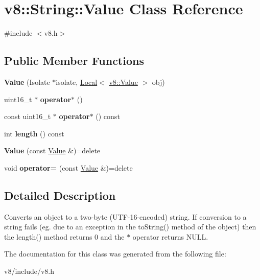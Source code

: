 \hypertarget{classv8_1_1String_1_1Value}{}\section{v8\+:\+:String\+:\+:Value Class Reference}
\label{classv8_1_1String_1_1Value}


{\ttfamily \#include $<$v8.\+h$>$}

\subsection*{Public Member Functions}
\begin{DoxyCompactItemize}
\item 
\mbox{\label{classv8_1_1String_1_1Value_a9254394df4e1c4a8d9749cc0a5b55601}} 
{\bfseries Value} (Isolate $\ast$isolate, \mbox{\hyperlink{classv8_1_1Local}{Local}}$<$ \mbox{\hyperlink{classv8_1_1Value}{v8\+::\+Value}} $>$ obj)
\item 
\mbox{\label{classv8_1_1String_1_1Value_ae4f44b1977968de2e9f2ff703437fde3}} 
uint16\+\_\+t $\ast$ {\bfseries operator$\ast$} ()
\item 
\mbox{\label{classv8_1_1String_1_1Value_a15e247c80ec874daee13e6fca1b24629}} 
const uint16\+\_\+t $\ast$ {\bfseries operator$\ast$} () const
\item 
\mbox{\label{classv8_1_1String_1_1Value_aeb5be29097c4c23c2c63fe833145dfe4}} 
int {\bfseries length} () const
\item 
\mbox{\label{classv8_1_1String_1_1Value_ac7ef41f1e6890bb36bde462a11ea4de1}} 
{\bfseries Value} (const \mbox{\hyperlink{classv8_1_1String_1_1Value}{Value}} \&)=delete
\item 
\mbox{\label{classv8_1_1String_1_1Value_adb46ab85e1def9411012c67cbefb3385}} 
void {\bfseries operator=} (const \mbox{\hyperlink{classv8_1_1String_1_1Value}{Value}} \&)=delete
\end{DoxyCompactItemize}


\subsection{Detailed Description}
Converts an object to a two-\/byte (U\+T\+F-\/16-\/encoded) string. If conversion to a string fails (eg. due to an exception in the to\+String() method of the object) then the length() method returns 0 and the $\ast$ operator returns N\+U\+LL. 

The documentation for this class was generated from the following file\+:\begin{DoxyCompactItemize}
\item 
v8/include/v8.\+h\end{DoxyCompactItemize}
